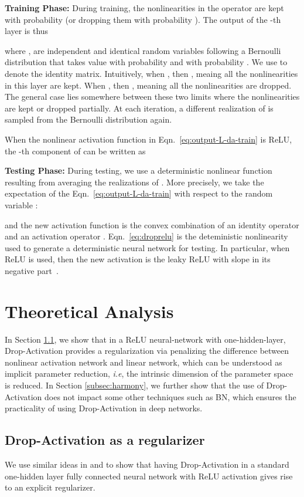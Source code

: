 \documentclass[11pt]{article}
\def\ie{\emph{i.e}}
\begin{document}
\textbf{Training Phase:}  During training, the  nonlinearities  in the operator  are kept with probability  (or dropping them with probability ). The output of the -th layer is thus

where ,  are independent and identical random variables following a Bernoulli distribution  that takes value  with probability  and  with probability . We use  to denote the identity matrix. Intuitively, when , then , meaing all the nonlinearities in this layer are kept. When  , then , meaning all the nonlinearities are dropped. The general case lies somewhere between these two limits where the nonlinearities are kept or dropped partially. At each iteration, a different realization of  is sampled from the Bernoulli distribution again. 

When the nonlinear activation function in Eqn.~\eqref{eq:output-L-da-train} is ReLU, the -th component of  can be written as



\textbf{Testing Phase:} During testing, we use a deterministic nonlinear function resulting from averaging the realizations of . More precisely, we take the expectation of the Eqn.~\eqref{eq:output-L-da-train} with respect to the random variable :

and the new activation function  is the convex combination of an  identity operator  and an activation operator . Eqn.~\eqref{eq:droprelu} is the deteministic nonlinearity used to generate a deterministic neural network for testing. In particular, when ReLU is used, then the new activation  is the leaky ReLU with slope  in its negative part~\cite{rrelu}.

\section{Theoretical Analysis}
\label{sec:5}
In Section \ref{subsec:regularizer}, we show that in a ReLU neural-network with one-hidden-layer, Drop-Activation provides a regularization via penalizing the difference between nonlinear activation network and linear network, which can be understood as implicit parameter reduction, \ie, the intrinsic dimension of the parameter space is reduced. In Section \ref{subsec:harmony}, we further show that the use of Drop-Activation does not impact some other techniques such as BN, which ensures the practicality of using Drop-Activation in deep networks.

\subsection{Drop-Activation as a regularizer}
\label{subsec:regularizer}
We use similar ideas in \cite{dropout} and \cite{dropanalysis} to show that having Drop-Activation in a standard one-hidden layer fully connected neural network with ReLU activation gives rise to an explicit regularizer.
\end{document}

